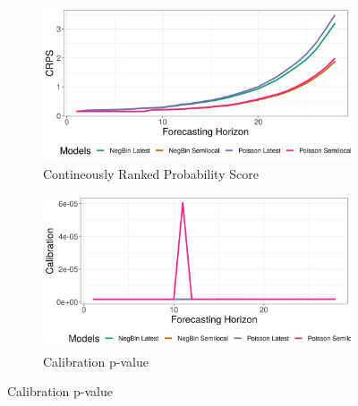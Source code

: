 \begin{figure}[H]
\begin{subfigure}{0.5\textwidth}
  \centering
  \includegraphics[width=\linewidth]{../output/Oicha_crps.png}  
  \caption{Contineously Ranked Probability Score}
  \label{Oicha_scores_1}
\end{subfigure}
\begin{subfigure}{0.5\textwidth}
  \centering
  \includegraphics[width=\linewidth]{../output/Oicha_calibration.png}  
  \caption{Calibration p-value}
  \label{Oicha_scores_2}
\end{subfigure}


\end{figure}
